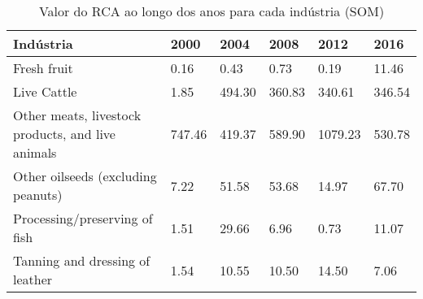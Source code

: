\begin{table}
\centering
\caption{Valor do RCA ao longo dos anos para cada indústria (SOM)}
\begin{tabular}{p{6cm}p{1.5cm}p{1.5cm}p{1.5cm}p{1.5cm}p{1.5cm}}
\toprule
                                        Indústria &   2000 &   2004 &   2008 &    2012 &   2016 \\
\midrule
                                      Fresh fruit &   0.16 &   0.43 &   0.73 &    0.19 &  11.46 \\
                                      Live Cattle &   1.85 & 494.30 & 360.83 &  340.61 & 346.54 \\
Other meats, livestock products, and live animals & 747.46 & 419.37 & 589.90 & 1079.23 & 530.78 \\
               Other oilseeds (excluding peanuts) &   7.22 &  51.58 &  53.68 &   14.97 &  67.70 \\
                    Processing/preserving of fish &   1.51 &  29.66 &   6.96 &    0.73 &  11.07 \\
                  Tanning and dressing of leather &   1.54 &  10.55 &  10.50 &   14.50 &   7.06 \\
\bottomrule
\end{tabular}
\end{table}
